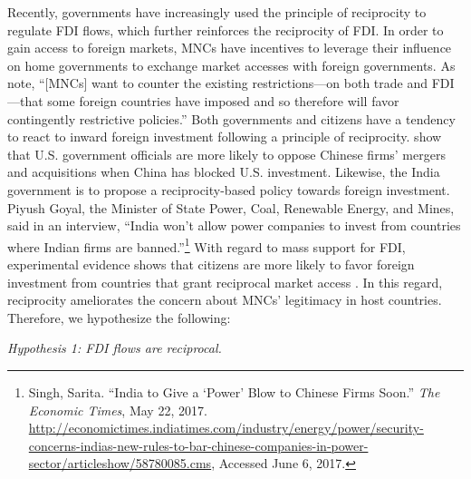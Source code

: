 \documentclass[reqno,onecolumn,letterpaper,12pt]{article}
\begin{document}
Recently, governments have increasingly used the principle of reciprocity to regulate FDI flows, which further reinforces the reciprocity of FDI. %
In order to gain access to foreign markets, MNCs have incentives to leverage their influence on home governments to exchange market accesses with foreign governments. %
As \citet[6]{Crystal:2003} note, ``[MNCs] want to counter the existing restrictions---on both trade and FDI---that some foreign countries have imposed and so therefore will favor contingently restrictive policies.'' Both governments and citizens have a tendency to react to inward foreign investment following a principle of reciprocity. \citet{Tingley:2015} show that U.S. government officials are more likely to oppose Chinese firms' mergers and acquisitions when China has blocked U.S. investment. Likewise, the India government is to propose a reciprocity-based policy towards foreign investment. Piyush Goyal, the Minister of State Power, Coal, Renewable Energy, and Mines, said in an interview, ``India won't allow power companies to invest from countries where Indian firms are banned.''\footnote{Singh, Sarita. ``India to Give a `Power' Blow to Chinese Firms Soon.'' \textit{The Economic Times}, May 22, 2017. \url{http://economictimes.indiatimes.com/industry/energy/power/security-concerns-indias-new-rules-to-bar-chinese-companies-in-power-sector/articleshow/58780085.cms}, Accessed June 6, 2017.} With regard to mass support for FDI, experimental evidence shows that citizens are more likely to favor foreign investment from countries that grant reciprocal market access \citep{Chilton_et_al:forthcoming}. In this regard, reciprocity ameliorates the concern about MNCs' legitimacy in host countries. Therefore, we hypothesize the following:



\begin{center}
\textit{Hypothesis 1: FDI flows are reciprocal.}
\end{center}

\end{document}
